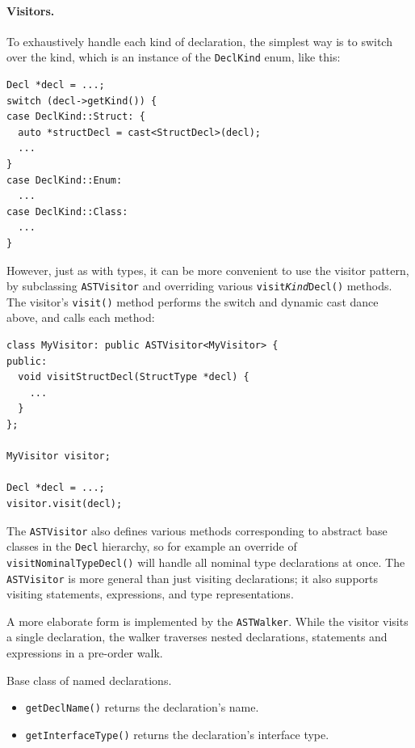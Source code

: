 \documentclass[../generics]{subfiles}
\begin{document}
\paragraph{Visitors.}
To exhaustively handle each kind of declaration, the simplest way is to switch over the kind, which is an instance of the \texttt{DeclKind} enum, like this:
\begin{Verbatim}
Decl *decl = ...;
switch (decl->getKind()) {
case DeclKind::Struct: {
  auto *structDecl = cast<StructDecl>(decl);
  ...
}
case DeclKind::Enum:
  ...
case DeclKind::Class:
  ...
}
\end{Verbatim}
However, just as with types, it can be more convenient to use the visitor pattern, by subclassing \texttt{ASTVisitor} and overriding various \texttt{visit\emph{Kind}Decl()} methods. The visitor's \texttt{visit()} method performs the switch and dynamic cast dance above, and calls each method:
\begin{Verbatim}
class MyVisitor: public ASTVisitor<MyVisitor> {
public:
  void visitStructDecl(StructType *decl) {
    ...
  }
};

MyVisitor visitor;

Decl *decl = ...;
visitor.visit(decl);
\end{Verbatim}
The \texttt{ASTVisitor} also defines various methods corresponding to abstract base classes in the \texttt{Decl} hierarchy, so for example an override of \texttt{visitNominalTypeDecl()} will handle all nominal type declarations at once. The \texttt{ASTVisitor} is more general than just visiting declarations; it also supports visiting statements, expressions, and type representations.

A more elaborate form is implemented by the \texttt{ASTWalker}. While the visitor visits a single declaration, the walker traverses nested declarations, statements and expressions in a pre-order walk.

Base class of named declarations.

\begin{itemize}
\item \texttt{getDeclName()} returns the declaration's name.
\item \texttt{getInterfaceType()} returns the declaration's interface type.
\end{itemize}
\end{document}
